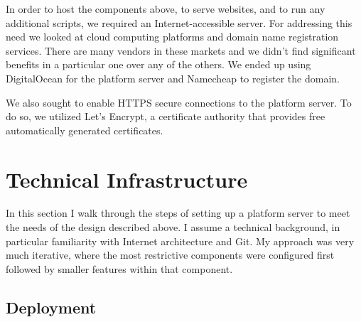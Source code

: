 \documentclass[12pt,twoside]{mitthesis}
\newcommand{\draft}[1]{{\color{blue} #1}}
\begin{document}
\draft{In order to host the components above, to serve websites, and to run any additional scripts, we required an Internet-accessible server. For addressing this need we looked at cloud computing platforms and domain name registration services. There are many vendors in these markets and we didn't find significant benefits in a particular one over any of the others. We ended up using DigitalOcean for the platform server and Namecheap to register the domain.

We also sought to enable HTTPS secure connections to the platform server. To do so, we utilized Let's Encrypt, a certificate authority that provides free automatically generated certificates.}

\section{Technical Infrastructure}

\draft{In this section I walk through the steps of setting up a platform server to meet the needs of the design described above. I assume a technical background, in particular familiarity with Internet architecture and Git. My approach was very much iterative, where the most restrictive components were configured first followed by smaller features within that component.}

\subsection{Deployment}
\end{document}
